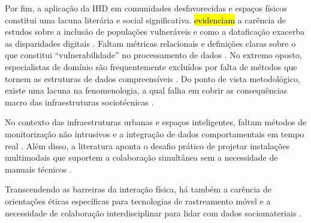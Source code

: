 \documentclass[
	12pt,				%
	oneside,			%
	a4paper,			%
	english,			%
	brazil				%
	]{abntex2ppgsi}
\newcommand{\hlciteonline}[1]{\colorbox{yellow}{\citeonline{#1}}} %
\begin{document}
    Por fim, a aplicação da IHD em comunidades desfavorecidas e espaços físicos constitui uma lacuna literária e social significativa. \hlciteonline{Hayes2021} \hl{evidenciam} a carência de estudos sobre a inclusão de populações vulneráveis e como a dataficação exacerba as disparidades digitais \cite{Locoro2020}. Faltam métricas relacionais e definições claras sobre o que constitui ``vulnerabilidade'' no processamento de dados \cite{malgieri2020vulnerable, Locoro2020}. No extremo oposto, especialistas de domínio são frequentemente excluídos por falta de métodos que tornem as estruturas de dados compreensíveis \cite{seidelin2020foregrounding}. Do ponto de vista metodológico, existe uma lacuna na fenomenologia, a qual falha em cobrir as consequências macro das infraestruturas sociotécnicas \cite{Parviainen2016}. 

    No contexto das infraestruturas urbanas e espaços inteligentes, faltam métodos de monitorização não intrusivos e a integração de dados comportamentais em tempo real \cite{bavaresco2019technological}. Além disso, a literatura aponta o desafio prático de projetar instalações multimodais que suportem a colaboração simultânea sem a necessidade de manuais técnicos \cite{Bartram2022, Alhakamy2021, Alhakamy2020246, Trajkova2020}.

    Transcendendo as barreiras da interação física, há também a carência de orientações éticas específicas para tecnologias de rastreamento móvel e a necessidade de colaboração interdisciplinar para lidar com dados sociomateriais \cite{kaufmann2021ethical}. 
\end{document}
